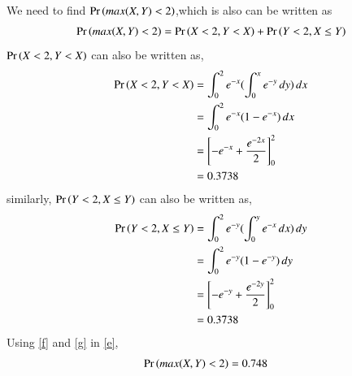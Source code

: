 \documentclass[journal,12pt,twocolumn]{IEEEtran}
\begin{document}
We need to find $\Pr\left( max(X,Y)<2\right)$,which is also can be written as
\begin{align}
   \Pr\left(max(X,Y)<2\right) =\Pr\left(X<2 ,Y<X\right) + \Pr\left(Y<2 ,X\le Y\right) \label{e}
\end{align}
 $\Pr\left(X<2 ,Y<X\right)$ can also be written as,
 \begin{align}
  \Pr\left(X<2 ,Y<X\right) &=\int_{0}^{2}{e^{-x}(\int_{0}^{x}{e^{-y}}\,dy)}\,dx\\
  &= \int_{0}^{2}{e^{-x}(1-e^{-x})}\,dx\\
   &= \left[-e^{-x} +\frac{e^{-2x}}{2}\right]_0^2\\
    &=0.3738 \label{f}
\end{align}
similarly, $\Pr\left(Y<2 ,X\le Y\right)$ can also be written as,
\begin{align}
  \Pr\left(Y<2 ,X\le Y\right) &=\int_{0}^{2}{e^{-y}(\int_{0}^{y}{e^{-x}}\,dx)}\,dy\\
  &= \int_{0}^{2}{e^{-y}(1-e^{-y})}\,dy\\
   &= \left[-e^{-y} +\frac{e^{-2y}}{2}\right]_0^2\\
    &=0.3738 \label{g}
\end{align}
Using \eqref{f} and \eqref{g} in \eqref{e},
\begin{align}
 \Pr\left(max(X,Y)<2\right) &=0.748 
\end{align}
\end{document}
